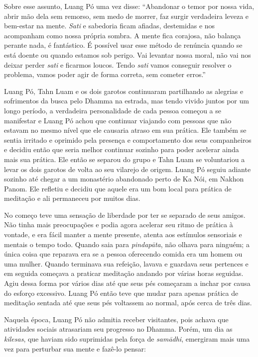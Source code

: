 Sobre esse assunto, Luang Pó uma vez disse: ``Abandonar o temor por
nossa vida, abrir mão dela sem remorso, sem medo de morrer, faz surgir
verdadeira leveza e bem-estar na mente. \emph{Sati} e sabedoria ficam
afiadas, destemidas e nos acompanham como nossa própria sombra. A mente
fica corajosa, não balança perante nada, é fantástico. É possível usar
esse método de renúncia quando se está doente ou quando estamos sob
perigo. Vai levantar nossa moral, não vai nos deixar perder \emph{sati}
e ficarmos loucos. Tendo \emph{sati} vamos conseguir resolver o
problema, vamos poder agir de forma correta, sem cometer erros.''

Luang Pó, Tahn Luam e os dois garotos continuaram partilhando as
alegrias e sofrimentos da busca pelo Dhamma na estrada, mas tendo vivido
juntos por um longo período, a verdadeira personalidade de cada pessoa
começou a se manifestar e Luang Pó achou que continuar viajando com
pessoas que não estavam no mesmo nível que ele causaria atraso em sua
prática. Ele também se sentia irritado e oprimido pela presença e
comportamento dos seus companheiros e decidiu então que seria melhor
continuar sozinho para poder acelerar ainda mais sua prática. Ele então
se separou do grupo e Tahn Luam se voluntariou a levar os dois garotos
de volta ao seu vilarejo de origem. Luang Pó seguiu adiante sozinho até
chegar a um monastério abandonado perto de Ka Nói, em Nakhon Panom. Ele
refletiu e decidiu que aquele era um bom local para prática de meditação
e ali permaneceu por muitos dias.

No começo teve uma sensação de liberdade por ter se separado de seus
amigos. Não tinha mais preocupações e podia agora acelerar seu ritmo de
prática à vontade, e era fácil manter a mente presente, atenta aos
estímulos sensoriais e mentais o tempo todo. Quando saia para
\emph{pindapāta}, não olhava para ninguém; a única coisa que reparava
era se a pessoa oferecendo comida era um homem ou uma mulher. Quando
terminava sua refeição, lavava e guardava seus pertences e em seguida
começava a praticar meditação andando por várias horas seguidas. Agiu
dessa forma por vários dias até que seus pés começaram a inchar por
causa do esforço excessivo. Luang Pó então teve que mudar para apenas
prática de meditação sentada até que seus pés voltassem ao normal, após
cerca de três dias.

Naquela época, Luang Pó não admitia receber visitantes, pois achava que
atividades sociais atrasariam seu progresso no Dhamma. Porém, um dia as
\emph{kilesas}, que haviam sido suprimidas pela força de \emph{samādhi},
emergiram mais uma vez para perturbar sua mente e fazê-lo pensar:

